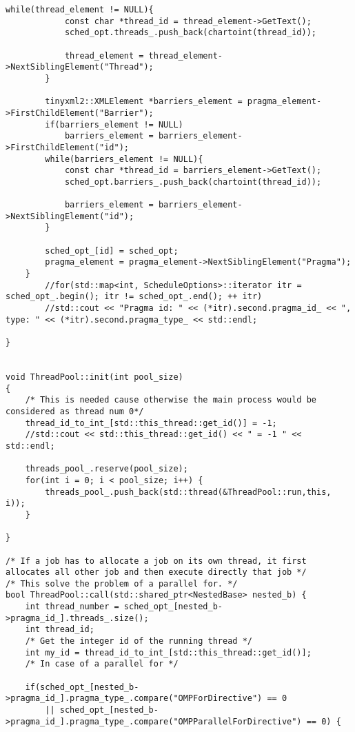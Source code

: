 \documentclass[a4paper,11pt,twoside]{book}
\begin{document}
\begin{lstlisting}[language=CCC, caption=thread\_pool.cpp]
        while(thread_element != NULL){
            const char *thread_id = thread_element->GetText();
            sched_opt.threads_.push_back(chartoint(thread_id));

            thread_element = thread_element->NextSiblingElement("Thread");
        }
        
        tinyxml2::XMLElement *barriers_element = pragma_element->FirstChildElement("Barrier");
        if(barriers_element != NULL)
            barriers_element = barriers_element->FirstChildElement("id");
        while(barriers_element != NULL){
            const char *thread_id = barriers_element->GetText();
            sched_opt.barriers_.push_back(chartoint(thread_id));

            barriers_element = barriers_element->NextSiblingElement("id");
        }

        sched_opt_[id] = sched_opt;
        pragma_element = pragma_element->NextSiblingElement("Pragma");
    }
        //for(std::map<int, ScheduleOptions>::iterator itr = sched_opt_.begin(); itr != sched_opt_.end(); ++ itr)
        //std::cout << "Pragma id: " << (*itr).second.pragma_id_ << ", type: " << (*itr).second.pragma_type_ << std::endl;

}


void ThreadPool::init(int pool_size)
{
    /* This is needed cause otherwise the main process would be considered as thread num 0*/
    thread_id_to_int_[std::this_thread::get_id()] = -1;
    //std::cout << std::this_thread::get_id() << " = -1 " << std::endl;

    threads_pool_.reserve(pool_size);
    for(int i = 0; i < pool_size; i++) {
        threads_pool_.push_back(std::thread(&ThreadPool::run,this, i));
    }

}

/* If a job has to allocate a job on its own thread, it first allocates all other job and then execute directly that job */
/* This solve the problem of a parallel for. */
bool ThreadPool::call(std::shared_ptr<NestedBase> nested_b) {
    int thread_number = sched_opt_[nested_b->pragma_id_].threads_.size();
    int thread_id;
    /* Get the integer id of the running thread */
    int my_id = thread_id_to_int_[std::this_thread::get_id()];
    /* In case of a parallel for */

    if(sched_opt_[nested_b->pragma_id_].pragma_type_.compare("OMPForDirective") == 0
        || sched_opt_[nested_b->pragma_id_].pragma_type_.compare("OMPParallelForDirective") == 0) {
        

\end{lstlisting}
\end{document}
